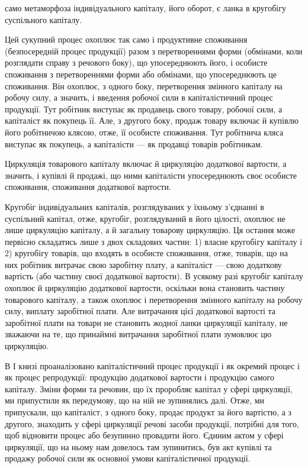 \parcont{}  %
само метаморфоза індивідуального капіталу, його оборот, є ланка в кругобігу
суспільного капіталу.

Цей сукупний процес охоплює так само і продуктивне споживання
(безпосередній процес продукції) разом з перетвореннями форми (обмінами,
коли розглядати справу з речового боку), що упосереднюють його,
і особисте споживання з перетвореннями форми або обмінами, що упосереднюють
це споживання. Він охоплює, з одного боку, перетворення
змінного капіталу на робочу силу, а значить, і введення робочої сили в
капіталістичний процес продукції. Тут робітник виступає як продавець
свого товару, робочої сили, а капіталіст як покупець її. Але, з другого
боку, продаж товару включає й купівлю його робітничою клясою, отже, її
особисте споживання. Тут робітнича кляса виступає як покупець, а капіталісти
— як продавці товарів робітникам.

Циркуляція товарового капіталу включає й циркуляцію додаткової
вартости, а значить, і купівлі й продажі, що ними капіталісти упосереднюють
своє особисте споживання, споживання додаткової вартости.

Кругобіг індивідуальних капіталів, розглядуваних у їхньому з’єднанні
в суспільний капітал, отже, кругобіг, розглядуваний в його цілості, охоплює
не лише циркуляцію капіталу, а й загальну товарову циркуляцію.
Ця остання може первісно складатись лише з двох складових частин:
1) власне кругобігу капіталу і 2) кругобігу товарів, що входять в особисте
споживання, отже, товарів, що на них робітник витрачає свою заробітну
плату, а капіталіст — свою додаткову вартість (або частину своєї
додаткової вартости). В усякому разі кругобіг капіталу охоплює й циркуляцію
додаткової вартости, оскільки вона становить частину товарового
капіталу, а також охоплює і перетворення змінного капіталу на робочу
силу, виплату заробітної плати. Але витрачання цієї додаткової вартості
та заробітної плати на товари не становить жодної ланки циркуляції
капіталу, не зважаючи на те, що принаймні витрачання заробітної плати
зумовлює цю циркуляцію.

В І книзі проаналізовано капіталістичний процес продукції і як окремий
процес і як процес репродукції: продукцію додаткової вартости
і продукцію самого капіталу. Зміни форми та речовин, що їх проробляє
капітал у сфері циркуляції, ми припустили як передумову, що на
ній не зупинялись далі. Отже, ми припускали, що капіталіст, з одного
боку, продає продукт за його вартістю, а з другого, знаходить у сфері
циркуляції речові засоби продукції, потрібні для того, щоб відновити
процес або безупинно провадити його. Єдиним актом у сфері циркуляції,
що на ньому нам довелось там зупинитись, був акт купівлі та продажу
робочої сили як основної умови капіталістичної продукції.

